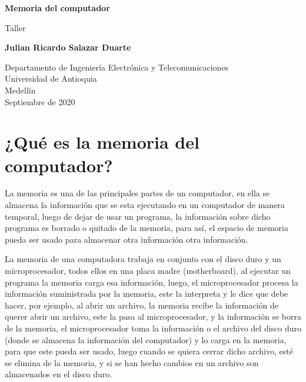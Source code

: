 \documentclass{article}
\begin{document}
\begin{titlepage}
    \begin{center}
        \vspace*{1cm}
            
        \Huge
        \textbf{Memoria del computador}
            
        \vspace{0.5cm}
        \LARGE
        Taller
            
        \vspace{1.5cm}
            
        \textbf{Julian Ricardo Salazar Duarte}
            
        \vfill
            
        \vspace{0.8cm}
            
        \Large
        Departamento de Ingeniería Electrónica y Telecomunicaciones\\
        Universidad de Antioquia\\
        Medellín\\
        Septiembre de 2020
            
    \end{center}
\end{titlepage}

\tableofcontents

\newpage

\section{¿Qué es la memoria del computador?}
La memoria es una de las principales partes de un computador, en ella se almacena la información que se esta ejecutando en un computador de manera temporal, luego de dejar de usar un programa, la información sobre dicho programa es borrado o quitado de la memoria, para así, el espacio de memoria pueda ser usado para almacenar otra información otra información.
\vspace{0.5cm}

La memoria de una computadora trabaja en conjunto con el disco duro y un microprocesador, todos ellos en una placa madre (motherboard), al ejecutar un programa la memoria carga esa información, luego, el microprocesador procesa la información suministrada por la memoria, este la interpreta y le dice que debe hacer, por ejemplo, al abrir un archivo, la memoria recibe la información de querer abrir un archivo, este la pasa al microprocesador, y la información se borra de la memoria, el microprocesador toma la información o el archivo del disco duro (donde se almacena la información del computador) y lo carga en la memoria, para que este pueda ser usado, luego cuando se quiera cerrar dicho archivo, esté se elimina de la memoria, y si se han hecho cambios en un archivo son almacenados en el disco duro.
\end{document}
